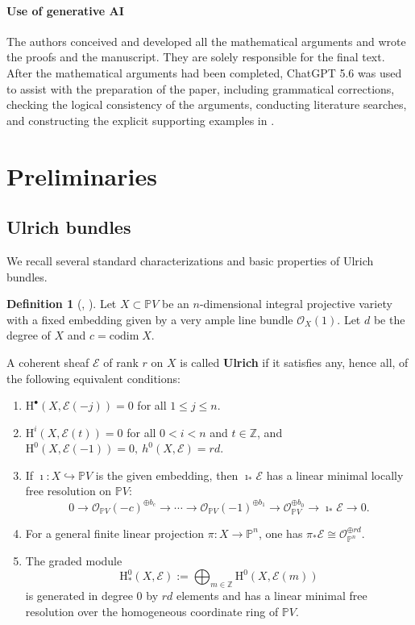 \documentclass[12pt, letterpaper]{amsart}
\theoremstyle{definition}
\newtheorem{definition}[theorem]{Definition}
\newcommand{\PP}{\mathbb{P} }
\newcommand{\ZZ}{\mathbb{Z} }
\newcommand{\cE}{\mathcal{E} }
\newcommand{\cO}{\mathcal{O} }
\newcommand{\rH}{\mathrm{H} }
\def\codim{\mathrm{codim}}
\begin{document}
\medskip

\paragraph*{\textbf{Use of generative AI}} 
The authors conceived and developed all the mathematical arguments and wrote the proofs and the manuscript. They are solely responsible for the final text. After the mathematical arguments had been completed, ChatGPT 5.6 was used to assist with the preparation of the paper, including grammatical corrections, checking the logical consistency of the arguments, conducting literature searches, and constructing the explicit supporting examples in \cite{JLM26}.

\tableofcontents

\section{Preliminaries}\label{sec:preliminary}

\subsection{Ulrich bundles}

We recall several standard characterizations and basic properties of Ulrich bundles.

\begin{definition}[{\cite[Proposition~2.1]{ES03}, \cite[Chapter~3]{CMRPL21}}]\label{def:Ulrich}
Let \(X \subset \PP V\) be an \(n\)-dimensional integral projective variety with a fixed embedding given by a very ample line bundle \(\cO_X(1)\). Let \(d\) be the degree of \(X\) and \(c = \codim \; X\).

A coherent sheaf \(\cE\) of rank \(r\) on \(X\) is called \textbf{Ulrich} if it satisfies any, hence all, of the following equivalent conditions:
\begin{enumerate}[label=\textup{(\roman*)}]
  \item \(\rH^\bullet(X,\cE(-j))=0\) for all \(1\le j\le n\).
  \item \(\rH^i(X,\cE(t))=0\) for all \(0<i<n\) and \(t\in\ZZ\), and \(\rH^0(X,\cE(-1))=0,\ h^0(X,\cE)=rd\).
  \item If \(\imath:X\hookrightarrow\PP V\) is the given embedding, then \(\imath_*\cE\) has a linear minimal locally free resolution on \(\PP V\):
  \[0\to \cO_{\PP V}(-c)^{\oplus b_{c}} \to\cdots\to \cO_{\PP V}(-1)^{\oplus b_1} \to \cO_{\PP V}^{\oplus b_0} \to\imath_*\cE\to0.\]
  \item For a general finite linear projection \(\pi:X\to\PP^n\), one has \(\pi_*\cE\cong\cO_{\PP^n}^{\oplus rd}\).
  \item The graded module
  \[\rH^0_*(X,\cE):=\bigoplus_{m\in\ZZ}\rH^0(X,\cE(m))\]
  is generated in degree \(0\) by \(rd\) elements and has a linear minimal free resolution over the homogeneous coordinate ring of \(\PP V\).
\end{enumerate}
\end{definition}
\end{document}
